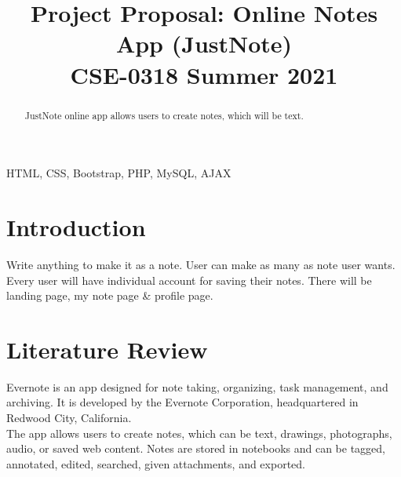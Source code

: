\documentclass[conference]{IEEEtran}
\begin{document}
\title{Project Proposal: Online Notes App (JustNote)\\
{\footnotesize \textsuperscript{}CSE-0318 Summer 2021 }
}

\author{
}

\maketitle

\begin{abstract}

JustNote online app allows users to create notes, which will be text.\\


\end{abstract}


\begin{IEEEkeywords}
HTML, CSS, Bootstrap, PHP, MySQL, AJAX
\end{IEEEkeywords}

\section{Introduction}
Write anything to make it as a note. User can make as many as note user wants.\\ Every user will have individual account for saving their notes. There will be landing page, my note page \& profile page. 

\section{Literature Review}

Evernote is an app designed for note taking, organizing, task management, and archiving. It is developed by the Evernote Corporation, headquartered in Redwood City, California.\\ The app allows users to create notes, which can be text, drawings, photographs, audio, or saved web content. Notes are stored in notebooks and can be tagged, annotated, edited, searched, given attachments, and exported.
\end{document}
